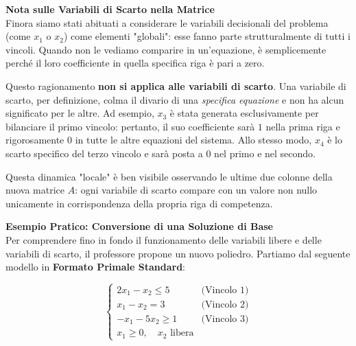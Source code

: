 \documentclass[12pt, a4paper]{article}
\begin{document}
	\vspace{0.4cm}
	\textbf{Nota sulle Variabili di Scarto nella Matrice}\\
	Finora siamo stati abituati a considerare le variabili decisionali del problema (come $x_1$ o $x_2$) come elementi "globali": esse fanno parte strutturalmente di tutti i vincoli. Quando non le vediamo comparire in un'equazione, è semplicemente perché il loro coefficiente in quella specifica riga è pari a zero.
	
	Questo ragionamento \textbf{non si applica alle variabili di scarto}. Una variabile di scarto, per definizione, colma il divario di una \textit{specifica equazione} e non ha alcun significato per le altre. Ad esempio, $x_3$ è stata generata esclusivamente per bilanciare il primo vincolo: pertanto, il suo coefficiente sarà $1$ nella prima riga e rigorosamente $0$ in tutte le altre equazioni del sistema. Allo stesso modo, $x_4$ è lo scarto specifico del terzo vincolo e sarà posta a $0$ nel primo e nel secondo.
	
	Questa dinamica "locale" è ben visibile osservando le ultime due colonne della nuova matrice $A$: ogni variabile di scarto compare con un valore non nullo unicamente in corrispondenza della propria riga di competenza.
	
	\vspace{0.6cm}
	\textbf{Esempio Pratico: Conversione di una Soluzione di Base}\\
	Per comprendere fino in fondo il funzionamento delle variabili libere e delle variabili di scarto, il professore propone un nuovo poliedro. Partiamo dal seguente modello in \textbf{Formato Primale Standard}:
	
	\[
	\begin{cases}
		2x_1 - x_2 \leq 5 \quad &\text{(Vincolo 1)} \\
		x_1 - x_2 = 3 \quad &\text{(Vincolo 2)} \\
		-x_1 - 5x_2 \geq 1 \quad &\text{(Vincolo 3)} \\
		x_1 \geq 0, \quad x_2 \text{ libera}
	\end{cases}
	\]
	
\end{document}
